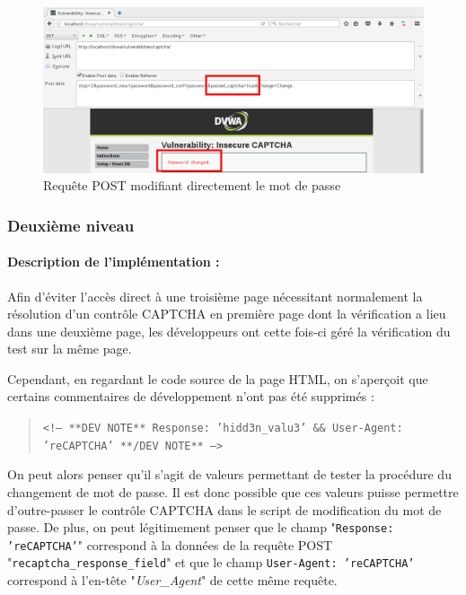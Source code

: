 \begin{figure}[!h]
\begin{center}

\includegraphics[scale=0.4]{images/captcha4.png}

\caption{Requête POST modifiant directement le mot de passe}
\label{captcha4}
\end{center}
\end{figure}

\subsubsection{Deuxième niveau}

\paragraph{Description de l'implémentation :}

Afin d'éviter l'accès direct à une troisième page nécessitant normalement la résolution d'un contrôle CAPTCHA en première page dont la vérification a lieu dans une deuxième page, les développeurs ont cette fois-ci géré la vérification du test sur la même page.

Cependant, en regardant le code source de la page HTML, on s'aperçoit que certains commentaires de développement n'ont pas été supprimés : 

\begin{quote}
\texttt{<!-- **DEV NOTE**   Response: 'hidd3n\_valu3'   \&\&   User-Agent: 'reCAPTCHA'   **/DEV NOTE** -->}
\end{quote}

On peut alors penser qu'il s'agit de valeurs permettant de tester la procédure du changement de mot de passe. Il est donc possible que ces valeurs puisse permettre d'outre-passer le contrôle CAPTCHA dans le script de modification du mot de passe. De plus, on peut légitimement penser que le champ "\texttt{Response: 'reCAPTCHA'}" correspond à la données de la requête POST "\texttt{recaptcha\_response\_field}" et que le champ \texttt{User-Agent: 'reCAPTCHA'} correspond à l'en-tête "\textit{User\_Agent}" de cette même requête.

